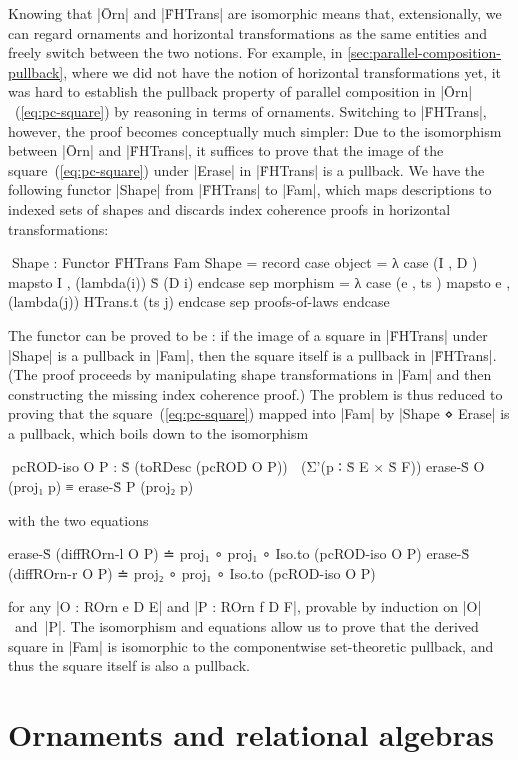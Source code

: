 Knowing that |Ōrn| and |ḞHTrans| are isomorphic means that, extensionally, we can regard ornaments and horizontal transformations as the same entities and freely switch between the two notions.
For example, in \autoref{sec:parallel-composition-pullback}, where we did not have the notion of horizontal transformations yet, it was hard to establish the pullback property of parallel composition in |Ōrn|~(\ref{eq:pc-square}) by reasoning in terms of ornaments.
Switching to |ḞHTrans|, however, the proof becomes conceptually much simpler:
Due to the isomorphism between |Ōrn| and |ḞHTrans|, it suffices to prove that the image of the square~(\ref{eq:pc-square}) under |Erase| in |ḞHTrans| is a pullback.
We have the following functor |Shape| from |ḞHTrans| to |Fam|, which maps descriptions to indexed sets of shapes and discards index coherence proofs in horizontal transformations:
\begin{code}
^^^Shape : Functor ḞHTrans Fam
Shape = record
  case  object    = λ case (I , D   ) mapsto I  , (lambda(i)) Ṡ (D i)            endcase
  sep   morphism  = λ case (e , ts  ) mapsto e  , (lambda({j})) HTrans.t (ts j)  endcase
  sep   proofs-of-laws endcase
\end{code}
The functor can be proved to be : if the image of a square in |ḞHTrans| under |Shape| is a pullback in |Fam|, then the square itself is a pullback in |ḞHTrans|.
(The proof proceeds by manipulating shape transformations in |Fam| and then constructing the missing index coherence proof.)
The problem is thus reduced to proving that the square~(\ref{eq:pc-square}) mapped into |Fam| by |Shape ⋄ Erase| is a pullback, which boils down to the isomorphism
\begin{code}
^^^pcROD-iso O P :  Ṡ (toRDesc (pcROD O P))
                      ≅ (Σ'(p ∶ Ṡ E × Ṡ F)) erase-Ṡ O (proj₁ p) ≡ erase-Ṡ P (proj₂ p)
\end{code}
with the two equations
\begin{code}
erase-Ṡ (diffROrn-l  O P) ≐ proj₁  ∘ proj₁ ∘ Iso.to (pcROD-iso O P)
erase-Ṡ (diffROrn-r  O P) ≐ proj₂  ∘ proj₁ ∘ Iso.to (pcROD-iso O P)
\end{code}
for any |O : ROrn e D E| and |P : ROrn f D F|, provable by induction on |O|~and~|P|.
The isomorphism and equations allow us to prove that the derived square in |Fam| is isomorphic to the componentwise set-theoretic pullback, and thus the square itself is also a pullback.

\section{Ornaments and relational algebras}
\label{sec:ornaments-and-relational-algebras}

